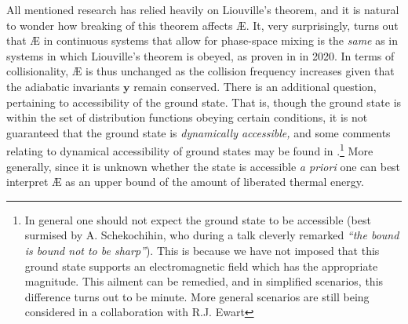 All mentioned research has relied heavily on Liouville's theorem, and it is natural to wonder how breaking of this theorem affects \AE{}. It, very surprisingly, turns out that \AE{} in continuous systems that allow for phase-space mixing is the \textit{same} as in systems in which Liouville's theorem is obeyed, as proven in \citet{kolmes2020recovering} in 2020. In terms of collisionality, \AE{} is thus unchanged as the collision frequency increases given that the adiabatic invariants $\boldsymbol{y}$ remain conserved. There is an additional question, pertaining to accessibility of the ground state. That is, though the ground state is within the set of distribution functions obeying certain conditions, it is not guaranteed that the ground state is {\it dynamically accessible,} and some comments relating to dynamical accessibility of ground states may be found in \citet{ewart2022collisionless}.\footnote{In general one should not expect the ground state to be accessible (best surmised by A. Schekochihin, who during a talk cleverly remarked \textit{``the bound is bound not to be sharp''}). This is because we have not imposed that this ground state supports an electromagnetic field which has the appropriate magnitude. This ailment can be remedied, and in simplified scenarios, this difference turns out to be minute. More general scenarios are still being considered in a collaboration with R.J. Ewart} More generally, since it is unknown whether the state is accessible \textit{a priori} one can best interpret \AE{} as an upper bound of the amount of liberated thermal energy. 
